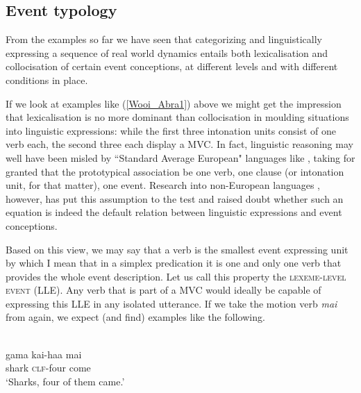 \subsection{Event typology}\label{sec:event-typology}

From the examples so far we have seen that categorizing and linguistically expressing a sequence of real world dynamics entails both lexicalisation and collocisation of certain event conceptions, at different levels and with different conditions in place. 

If we look at examples like (\ref{Wooi_Abra1}) above we might get the impression that lexicalisation is no more dominant than collocisation in moulding situations into linguistic expressions: while the first three intonation units consist of one verb each, the second three each display a MVC. In fact, linguistic reasoning may well have been misled by ``Standard Average European" languages like , taking for granted that the prototypical association be one verb, one clause (or intonation unit, for that matter), one event. Research into non-European languages \citep{Pawley1987, pawley2011event, baker2010complex, foley2010events, bohnemeyer2007principles}, however, has put this assumption to the test and raised doubt whether such an equation is indeed the default relation between linguistic expressions and event conceptions.

\largerpage[2]
Based on this view, we may say that a verb is the smallest event expressing unit by which I mean that in a simplex predication it is one and only one verb that provides the whole event description. Let us call this property the \textsc{lexeme-level event} (LLE). Any verb that is part of a MVC would ideally be capable of expressing this LLE in any isolated utterance. If we take the motion verb \textit{mai} from  again, we expect (and find) examples like the following.

\ea \label{WMH_Julio_goat309}
\\
\gll gama kai-haa mai \\
shark \textsc{clf}-four come \\
\glft `Sharks, four of them came.' \\ 
\z

